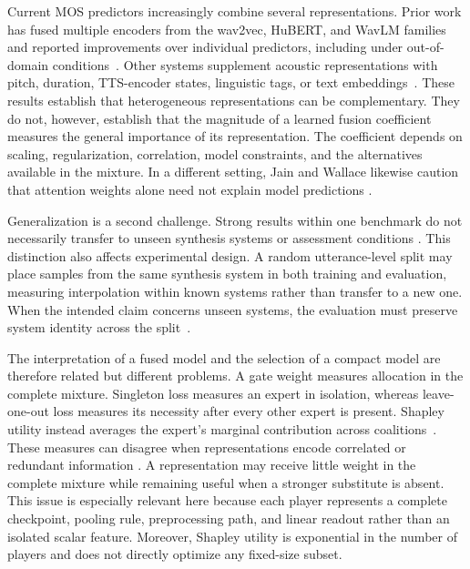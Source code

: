 \documentclass{article}
\begin{document}
Current MOS predictors increasingly combine several representations. Prior work
has fused multiple encoders from the wav2vec, HuBERT, and WavLM families and
reported improvements over individual predictors, including under
out-of-domain conditions~\cite{yang2022fusion}. Other systems supplement
acoustic representations with pitch, duration, TTS-encoder states, linguistic
tags, or text embeddings~\cite{vioni2023contentaware}. These results establish
that heterogeneous representations can be complementary. They do not,
however, establish that the magnitude of a learned fusion coefficient measures
the general importance of its representation. The coefficient depends on
scaling, regularization, correlation, model constraints, and the alternatives
available in the mixture. In a different setting, Jain and Wallace likewise
caution that attention weights alone need not explain model predictions
\cite{jain2019attention}.

Generalization is a second challenge. Strong results within one benchmark do
not necessarily transfer to unseen synthesis systems or assessment conditions
\cite{cooper2022generalization,huang2022voicemos}. This distinction also affects
experimental design. A random utterance-level split may place samples from the
same synthesis system in both training and evaluation, measuring interpolation
within known systems rather than transfer to a new one. When the intended claim
concerns unseen systems, the evaluation must preserve system identity across
the split~\cite{roberts2017crossvalidation}.

The interpretation of a fused model and the selection of a compact model are
therefore related but different problems. A gate weight measures allocation in
the complete mixture. Singleton loss measures an expert in isolation, whereas
leave-one-out loss measures its necessity after every other expert is present.
Shapley utility instead averages the expert's marginal contribution across
coalitions~\cite{shapley1953value,covert2020sage}. These measures can disagree
when representations encode correlated or redundant information
\cite{kumar2020shapley}. A representation may receive little weight in the
complete mixture while remaining useful when a stronger substitute is absent.
This issue is especially relevant here because each player represents a
complete checkpoint, pooling rule, preprocessing path, and linear readout
rather than an isolated scalar feature. Moreover, Shapley utility is
exponential in the number of players and does not directly optimize any
fixed-size subset.
\end{document}
